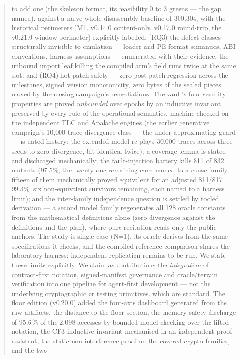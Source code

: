 \documentclass[11pt,a4paper]{article}
\begin{document}
\begin{abstract}
to add one (the skeleton format, its feasibility 0 to 3 greens --- the
gap named), against a naive whole-disassembly baseline of 300{,}304,
with the historical perimeters (M1, v0.14.0 content-only, v0.17.0
round-trip, the v0.21.0 window perimeter) explicitly labelled; (RQ3) the defect classes structurally invisible to
emulation --- loader and PE-format semantics, ABI conventions, harness
assumptions --- enumerated with their evidence, the unbound import leaf
killing the compiled arm's field runs twice at the same slot; and (RQ4)
hot-patch safety --- zero post-patch regression across the milestones,
signed version monotonicity, zero bytes of the sealed pieces moved by the
closing campaign's remediations. The vault's four security properties are
proved \emph{unbounded} over epochs by an inductive invariant preserved by
every rule of the operational semantics, machine-checked on the
independent TLC and Apalache engines (the earlier generative campaign's
10{,}000-trace divergence class --- the under-approximating guard --- is
dated history: the extended model re-plays 30{,}000 traces across three
seeds to zero divergence, bit-identical twice); a coverage lemma is stated
and discharged mechanically; the fault-injection battery kills 811 of 832
mutants (97.5\%, the twenty-one remaining each named to a cause family,
fifteen of them mechanically proved equivalent for an adjusted 811/817 =
99.3\%, six non-equivalent survivors remaining, each named to a harness
limit); and the inter-family independence question is settled by tooled
derivation --- a second model family regenerates all 128 oracle constants
from the mathematical definitions alone (zero divergence against the
definitions and the plan), where pure recitation reads only the public
anchors. The study is single-case (N=1), its oracle derives from the same
specifications it checks, and the compiled-reference comparison shares the
laboratory harness; independent replication remains to be run. We state
these limits explicitly. We claim as contributions the \emph{integration}
of contract-first notation, signed-manifest governance and oracle/terrain
verification into one pipeline for agent-first development --- not the
underlying cryptographic or testing primitives, which are standard. The floor edition (v0.20.0) added the four-axis dashboard generated
from the raw artifacts, the distance-to-the-floor section, the
memory-safety discharge of 95.6\,\% of the 2{,}098 accesses by bounded
model checking over the lifted notation, the CF3 inductive invariant
mechanised in an independent proof assistant, the static
non-interference proof on the covered crypto families, and the two

\end{abstract}
\end{document}
